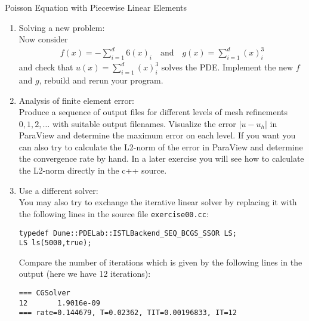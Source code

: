 \documentclass[12pt,a4paper]{article}
\begin{document}
\begin{Exercise}{Poisson Equation with Piecewise Linear Elements}
\begin{enumerate}
\item {\sc Solving a new problem}:\\
  Now consider
  \begin{align}
    f(x) =  -\sum_{i=1}^d 6(x)_i \quad\text{and}\quad  g(x) = \sum_{i=1}^d (x)_i^3
  \end{align}
  and check that $u(x)=\sum_{i=1}^d (x)_i^3$ solves the PDE. Implement
  the new $f$ and $g$, rebuild and rerun your program.

\item {\sc Analysis of finite element error}:\\
  Produce a sequence of output files for different levels of mesh
  refinements $0, 1, 2, \ldots$ with suitable output
  filenames. Visualize the error $|u-u_h|$ in Para\-View and determine
  the maximum error on each level.  If you want you can also try to
  calculate the L2-norm of the error in ParaView and determine the
  convergence rate by hand. In a later exercise you will see how to
  calculate the L2-norm directly in the c++ source.

\item {\sc Use a different solver}:\\
  You may also try to exchange the iterative linear solver by
  replacing it with the following lines in the source file
  \lstinline{exercise00.cc}:
  \begin{lstlisting}
typedef Dune::PDELab::ISTLBackend_SEQ_BCGS_SSOR LS;
LS ls(5000,true);
  \end{lstlisting}
  Compare the number of iterations which is given by the following lines
  in the output (here we have 12 iterations):
  \begin{lstlisting}
=== CGSolver
12       1.9016e-09
=== rate=0.144679, T=0.02362, TIT=0.00196833, IT=12
  \end{lstlisting}
\end{enumerate}
\end{Exercise}
\end{document}

